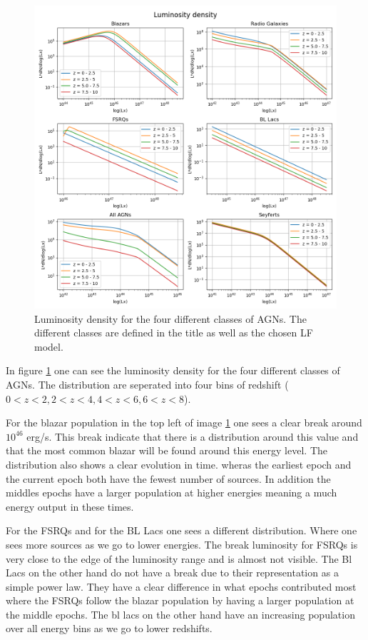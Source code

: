 \documentclass{article}
\begin{document}
\begin{figure}
    \centering
    \includegraphics[width = \textwidth]{new_plots/Luminosity density.png}
    \caption{Luminosity density for the four different classes of AGNs. The different classes are defined in the title as well as the chosen LF model.}
    \label{fig:LD}
\end{figure}

In figure \ref{fig:LD} one can see the luminosity density for the four different classes of AGNs. The distribution are 
seperated into four bins of redshift ($0<z<2,2<z<4,4<z<6,6<z<8$). %
  
For the blazar population in the top left of image \ref{fig:LD} one sees a clear break around $10^{46}$ erg/s. This break indicate that there is a distribution
around this value and that the most common blazar will be found around this energy level. The distribution also shows a clear evolution in time. wheras the earliest epoch
and the current epoch both have the fewest number of sources. In addition the middles epochs have a larger population at higher energies meaning a much energy output in these times. 

For the FSRQs and for the BL Lacs one sees a different distribution. Where one sees more sources as we go to lower energies. The break luminosity for FSRQs 
is very close to the edge of the luminosity range and is almost not visible. The Bl Lacs on the other hand do not have a break 
due to their representation as a simple power law. They have a clear difference in what epochs contributed most where the FSRQs follow the blazar population by having a larger population at the 
middle epochs. The bl lacs on the other hand have an increasing population over all energy bins as we go to lower redshifts.
\end{document}

